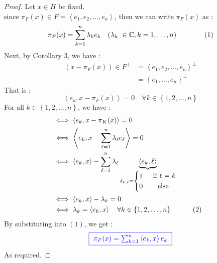 \begin{proof}
Let $x \in  H $ be fixed.  \\
since $\pi _{F}(x)  \in  F = \left\langle 
  e_1, e_2, \hdots , e _n 
\right\rangle$, then we can write $\pi _{F}(x)  $ as : 
\[
  \pi _{F}(x) = \sum_{k=1}^{n} 
  \lm_{k} e_{k} \quad (\lm_{k} \in  \CC , k=1, \hdots , n) \quad \quad 
  \quad \quad (1)  
\]
Next, by Corollary $3 $, we have : 
\begin{align*}
  (x-\pi _{F}(x) )  \in  F^{\bot } &=  
  \left\langle 
    e_1, e_2, \hdots , e _n 
  \right\rangle ^{\bot } \\
                                 &= 
              \left\{ e_1, \hdots , e _n  \right\}^{\bot }
\end{align*}
That is : 
\[
\left\langle 
  e_{k}, x-\pi _{F}(x) 
\right\rangle  = 0 \quad \forall k \in  \left\{ 
1, 2, \hdots , n
\right\}
\]
For all $k \in  \left\{ 1, 2, \hdots , n \right\} $, we have :
\begin{align*}
&\iff \left\langle 
  e_{k}, x - \pi _{K}(x) 
\right\rangle  = 0 \\
& \iff 
\left\langle 
  e_{k}, 
  x - \sum_{\ell =1}^{n} 
  \lambda_{\ell } e_{\ell }
\right\rangle = 0 \\
& \iff   
\left\langle 
  e_{k}, x
\right\rangle  - 
\sum_{\ell  = 1}^{n}  
\lambda_{\ell }
\underbrace{
\left\langle 
  e_{k}, \ell 
\right\rangle 
}_{
    \delta _{k, \ell } = 
    \begin{cases}
      1 \\
      0
    \end{cases}
    \begin{gathered}  
      \text{ if } \ell  = k\\ 
      \text{ else } 
    \end{gathered}
    } 
    \\
&\iff  
\left\langle 
  e_{k}, x
\right\rangle  - \lambda_{k} = 0 \\
& \iff 
\lambda_{k} = \left\langle 
  e_{k}, x
\right\rangle \quad 
\forall k \in  \left\{ 1, 2, \hdots , n \right\}
\quad \quad \quad (2) \quad 
\end{align*}
By substituting into $(1)$, we get : 
\[
  \textcolor{blue}{
  \fbox{
    $
  \pi _{F}(x)  =
  \sum_{k=1}^{n} 
  \left\langle 
    e_{k}, x
  \right\rangle  e_{k}
  $
  }
  }
\]
As required.

\end{proof}

